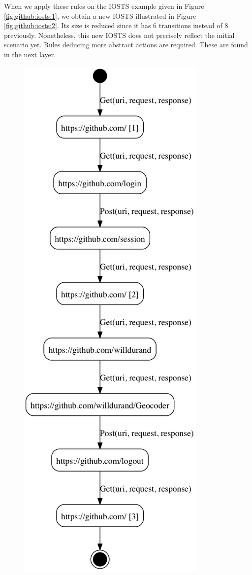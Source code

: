 \begin{example}
When we apply these rules on the IOSTS example given in Figure
\ref{fig:github:iosts:1}, we obtain a new IOSTS illustrated in
Figure \ref{fig:github:iosts:2}. Its size is reduced since it has
6 transitions instead of 8 previously. Nonetheless, this new
IOSTS does not precisely reflect the initial scenario yet. Rules
deducing more abstract actions are required. These are found in
the next layer.

\begin{figure}[h]
\begin{minipage}{.5\textwidth}
    \includegraphics[width=0.8\linewidth]{figures/gh-iosts-1.png}


\end{minipage}
\end{figure}
\end{example}
